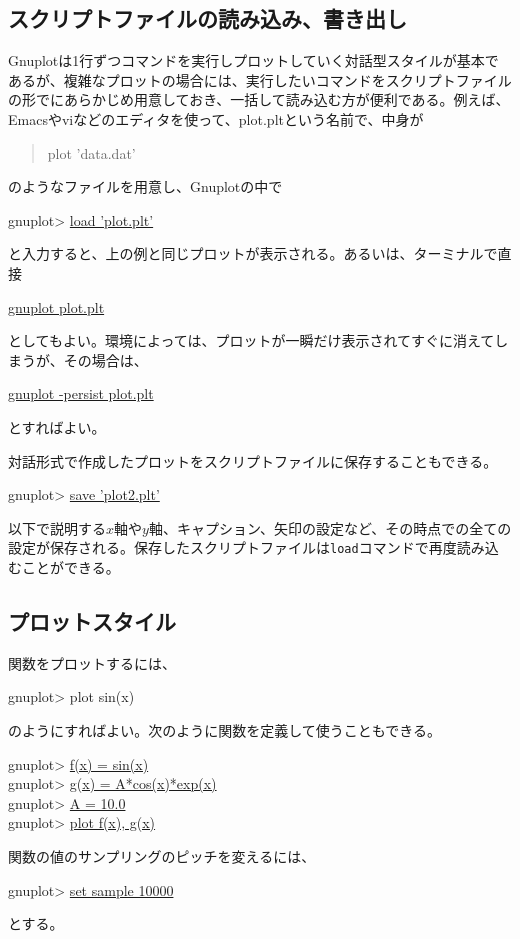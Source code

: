\subsection{スクリプトファイルの読み込み、書き出し}

Gnuplotは1行ずつコマンドを実行しプロットしていく対話型スタイルが基本であるが、複雑なプロットの場合には、実行したいコマンドをスクリプトファイルの形でにあらかじめ用意しておき、一括して読み込む方が便利である。例えば、Emacsやviなどのエディタを使って、plot.pltという名前で、中身が
\begin{quote}
plot 'data.dat'
\end{quote}
のようなファイルを用意し、Gnuplotの中で
\begin{commandline2}
gnuplot> \underline{load 'plot.plt'}
\end{commandline2} \noindent
と入力すると、上の例と同じプロットが表示される。あるいは、ターミナルで直接
\begin{commandline2}
\prompt \underline{gnuplot plot.plt}
\end{commandline2} \noindent
としてもよい。環境によっては、プロットが一瞬だけ表示されてすぐに消えてしまうが、その場合は、
\begin{commandline2}
\prompt \underline{gnuplot -persist plot.plt}
\end{commandline2} \noindent
とすればよい。

対話形式で作成したプロットをスクリプトファイルに保存することもできる。
\begin{commandline2}
gnuplot> \underline{save 'plot2.plt'}
\end{commandline2} \noindent
以下で説明する$x$軸や$y$軸、キャプション、矢印の設定など、その時点での全ての設定が保存される。保存したスクリプトファイルは{\tt load}コマンドで再度読み込むことができる。

\subsection{プロットスタイル}
関数をプロットするには、
\begin{commandline2}
gnuplot> plot sin(x)
\end{commandline2} \noindent
のようにすればよい。次のように関数を定義して使うこともできる。
\begin{commandline2}
gnuplot> \underline{f(x) = sin(x)} \\
gnuplot> \underline{g(x) = A*cos(x)*exp(x)} \\
gnuplot> \underline{A = 10.0} \\
gnuplot> \underline{plot f(x), g(x)}
\end{commandline2} \noindent
関数の値のサンプリングのピッチを変えるには、
\begin{commandline2}
gnuplot> \underline{set sample 10000}
\end{commandline2} \noindent
とする。

